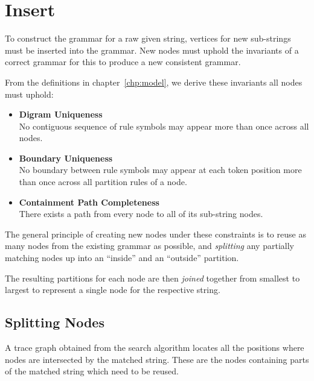 
\section{Insert}\label{sec:insert}
To construct the grammar for a raw given string, vertices for new sub-strings must be inserted into the grammar. New nodes must uphold the invariants of a correct grammar for this to produce a new consistent grammar.

\noindent
From the definitions in chapter~\ref{chp:model}, we derive these invariants all nodes must uphold:
\begin{itemize}
    \item \textbf{Digram Uniqueness}\\
    No contiguous sequence of rule symbols may appear more than once across all nodes.
    \item \textbf{Boundary Uniqueness}\\
    No boundary between rule symbols may appear at each token position more than once across all partition rules of a node.
    \item \textbf{Containment Path Completeness}\\
    There exists a path from every node to all of its sub-string nodes. 
\end{itemize}

\noindent
The general principle of creating new nodes under these constraints is to reuse as many nodes from the existing grammar as possible, and \textit{splitting} any partially matching nodes up into an ``inside'' and an ``outside'' partition.

The resulting partitions for each node are then \textit{joined} together from smallest to largest to represent a single node for the respective string.

\subsection{Splitting Nodes}

A trace graph obtained from the search algorithm locates all the positions where nodes are intersected by the matched string. These are the nodes containing parts of the matched string which need to be reused.

